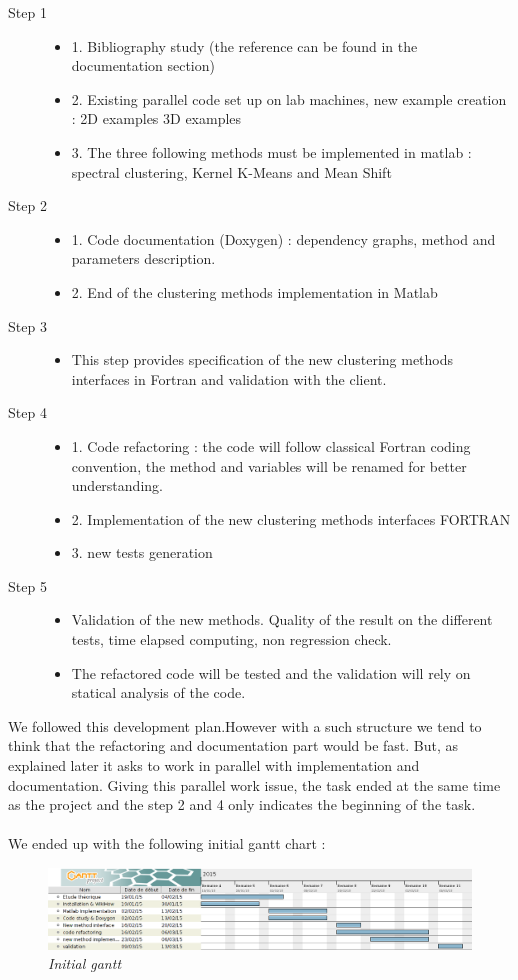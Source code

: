 \begin{description}
\item[Step 1]
\noindent
	\begin{itemize}
	\item 1. Bibliography study (the reference can be found in the documentation section)
 	\item 2. Existing parallel code set up on lab machines, new example creation : 2D examples 3D examples
	\item 3. The three following methods must be implemented in matlab : spectral clustering, Kernel K-Means and Mean Shift        
	\end{itemize} 
\item[Step 2]
\noindent
	\begin{itemize}
	\item 1. Code documentation (Doxygen) : dependency graphs, method and parameters description.
	\item 2. End of the clustering methods implementation in Matlab
	\end{itemize}
\item[Step 3]
\noindent
	\begin{itemize}
	\item This step provides specification of the new clustering methods interfaces in Fortran  and validation with the client.
	\end{itemize}
\item[Step 4]
\noindent
	\begin{itemize}
	\item 1. Code refactoring : the code will follow classical Fortran coding convention, the method and variables will be renamed for better understanding.
	\item 2. Implementation of the new clustering methods interfaces FORTRAN
	\item 3. new tests generation
	\end{itemize}
\item[Step 5]
\noindent
	\begin{itemize}
	\item Validation of the new methods. Quality of the result on the different tests, time elapsed computing, non regression check.
	\item The refactored code will be tested and the validation will rely on statical analysis of the code.
	\end{itemize}
\end{description}


We followed this development plan.However with a such structure we tend to think that the refactoring and documentation part would be fast. But, as explained later it asks to work in parallel with implementation and documentation. Giving this parallel work issue, the task ended at the same time as the project and the step 2 and 4 only indicates the beginning of the task.
 \\
 \\
 
  
 We ended up with the following initial gantt chart :
 
 \begin{figure}[h!]
\includegraphics[width=1\textwidth]{Image/gantt.png}\centering
\caption{\textit{Initial gantt}}
\end{figure}
